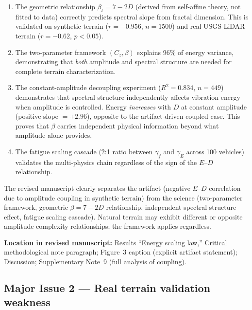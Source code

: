 \documentclass[11pt]{article}
\newcommand{\revloc}[1]{\noindent\textbf{Location in revised manuscript:} #1\medskip}
\begin{document}
\begin{enumerate}[leftmargin=*]
\item The geometric relationship $\beta_t = 7-2D$ (derived from self-affine theory, not fitted to data) correctly predicts spectral slope from fractal dimension. This is validated on synthetic terrain ($r = -0.956$, $n = 1500$) and real USGS LiDAR terrain ($r = -0.62$, $p < 0.05$).

\item The two-parameter framework $(C_z, \beta)$ explains 96\% of energy variance, demonstrating that \emph{both} amplitude and spectral structure are needed for complete terrain characterization.

\item The constant-amplitude decoupling experiment ($R^2 = 0.834$, $n = 449$) demonstrates that spectral structure independently affects vibration energy when amplitude is controlled. Energy \emph{increases} with $D$ at constant amplitude (positive slope $= +2.96$), opposite to the artifact-driven coupled case. This proves that $\beta$ carries independent physical information beyond what amplitude alone provides.

\item The fatigue scaling cascade (2:1 ratio between $\gamma_f$ and $\gamma_E$ across 100 vehicles) validates the multi-physics chain regardless of the sign of the $E$--$D$ relationship.
\end{enumerate}

\noindent The revised manuscript clearly separates the artifact (negative $E$--$D$ correlation due to amplitude coupling in synthetic terrain) from the science (two-parameter framework, geometric $\beta = 7-2D$ relationship, independent spectral structure effect, fatigue scaling cascade). Natural terrain may exhibit different or opposite amplitude-complexity relationships; the framework applies regardless.

\revloc{Results ``Energy scaling law,'' Critical methodological note paragraph; Figure~3 caption (explicit artifact statement); Discussion; Supplementary Note~9 (full analysis of coupling).}

\bigskip

\subsection*{Major Issue 2 --- Real terrain validation weakness}
\end{document}
